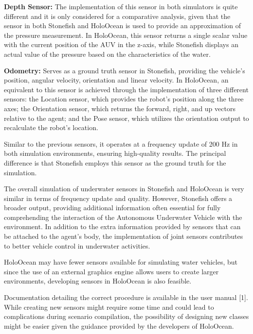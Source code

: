 \documentclass[]{article}
\begin{document}
	\textbf{Depth Sensor:} The implementation of this sensor in both simulators is quite different and it is only considered for a comparative analysis, given that the sensor in both Stonefish and HoloOcean is used to provide an approximation of the pressure measurement. In HoloOcean, this sensor returns a single scalar value with the current position of the AUV in the z-axis, while Stonefish displays an actual value of the pressure based on the characteristics of the water.
	
	\newpage
	
	\textbf{Odometry:} Serves as a ground truth sensor in Stonefish, providing the vehicle's position, angular velocity, orientation and linear velocity. In HoloOcean, an equivalent to this sensor is achieved through the implementation of three different sensors: the Location sensor, which provides the robot's position along the three axes; the Orientation sensor, which returns the forward, right, and up vectors relative to the agent; and the Pose sensor, which utilizes the orientation output to recalculate the robot's location.
	
	Similar to the previous sensors, it operates at a frequency update of 200 Hz in both simulation environments, ensuring high-quality results. The principal difference is that Stonefish employs this sensor as the ground truth for the simulation.
	
	The overall simulation of underwater sensors in Stonefish and HoloOcean is very similar in terms of frequency update and quality. However, Stonefish offers a broader output, providing additional information often essential for fully comprehending the interaction of the Autonomous Underwater Vehicle with the environment. In addition to the extra information provided by sensors that can be attached to the agent's body, the implementation of joint sensors contributes to better vehicle control in underwater activities.
	
	HoloOcean may have fewer sensors available for simulating water vehicles, but since the use of an external graphics engine allows users to create larger environments, developing sensors in HoloOcean is also feasible.  
	
	Documentation detailing the correct procedure is available in the user manual [1]. While creating new sensors might require some time and could lead to complications during scenario compilation, the possibility of designing new classes might be easier given the guidance provided by the developers of HoloOcean.
	
\end{document}
